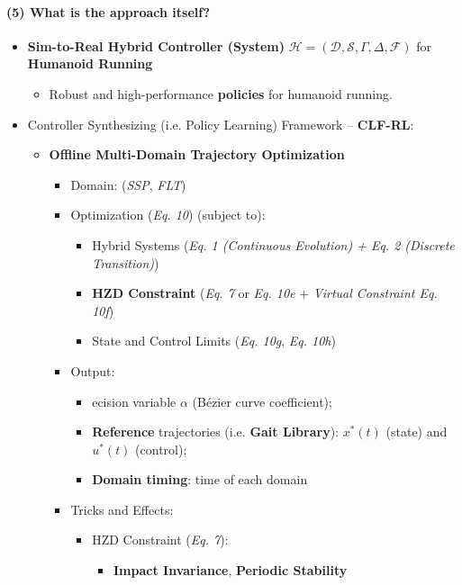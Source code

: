 \documentclass{article}
\begin{document}
\paragraph{(5) What is the approach itself?}
\begin{itemize}
  \item \textbf{Sim-to-Real Hybrid Controller (System)} $\mathcal{H} = (\mathcal{D}, \mathcal{S}, \Gamma, \Delta, \mathcal{F})$ for \textbf{Humanoid Running}
  \begin{itemize}
    \item Robust and high-performance \textbf{policies} for humanoid running.
  \end{itemize}
  \item Controller Synthesizing (i.e. Policy Learning) Framework -- \textbf{CLF-RL}:
  \begin{itemize}
    \item \textbf{Offline Multi-Domain Trajectory Optimization}
    \begin{itemize}
      \item Domain: (\textit{SSP}, \textit{FLT})
      \item Optimization (\textit{Eq. 10}) (subject to):
      \begin{itemize}
        \item Hybrid Systems (\textit{Eq. 1 (Continuous Evolution) + Eq. 2 (Discrete Transition)})
        \item \textbf{HZD Constraint} (\textit{Eq. 7} or \textit{Eq. 10e} + \textit{Virtual Constraint Eq. 10f})
        \item State and Control Limits (\textit{Eq. 10g}, \textit{Eq. 10h})
      \end{itemize}
      \item Output:
      \begin{itemize}
        \item ecision variable \textbf{$\alpha$} (Bézier curve coefficient);
        \item \textbf{Reference} trajectories (i.e. \textbf{Gait Library}): $x^*(t)$ (state) and $u^*(t)$ (control);
        \item \textbf{Domain timing}: time of each domain
      \end{itemize}
      \item Tricks and Effects:
      \begin{itemize}
        \item HZD Constraint (\textit{Eq. 7}):
        \begin{itemize}
          \item \textbf{Impact Invariance}, \textbf{Periodic Stability}

\end{itemize}
\end{itemize}
\end{itemize}
\end{itemize}
\end{itemize}
\end{document}
